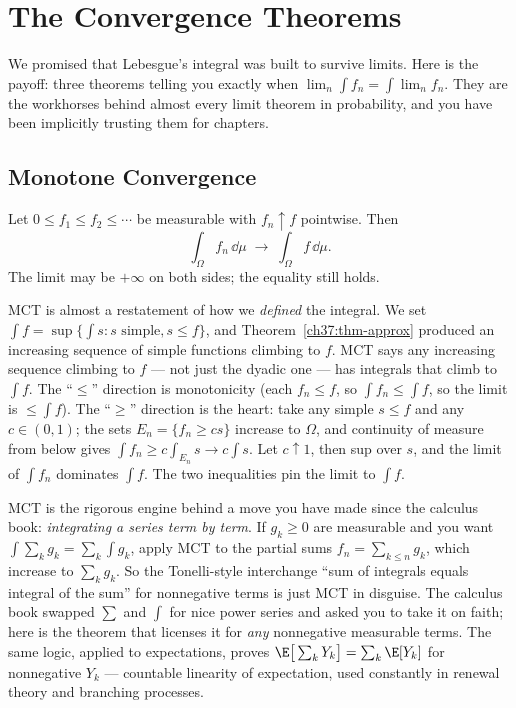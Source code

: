 \section{The Convergence Theorems}
\label{ch37:convergence}

We promised that Lebesgue's integral was built to survive limits. Here is the
payoff: three theorems telling you exactly when
$\lim_n \int f_n = \int \lim_n f_n$. They are the workhorses behind almost every
limit theorem in probability, and you have been implicitly trusting them for
chapters.

\subsection{Monotone Convergence}

\begin{theorem}
\label{ch37:thm-mct}
Let $0\le f_1\le f_2\le\cdots$ be measurable with $f_n\uparrow f$ pointwise.
Then
\[
  \int_\Omega f_n\,\dd\mu \;\longrightarrow\; \int_\Omega f\,\dd\mu .
\]
The limit may be $+\infty$ on both sides; the equality still holds.
\end{theorem}

\begin{whybox}
MCT is almost a restatement of how we \emph{defined} the integral. We set
$\int f = \sup\{\int s : s \text{ simple}, s\le f\}$, and
Theorem~\ref{ch37:thm-approx} produced an increasing sequence of simple
functions climbing to $f$. MCT says any increasing sequence climbing to $f$ ---
not just the dyadic one --- has integrals that climb to $\int f$. The
``$\le$'' direction is monotonicity (each $f_n\le f$, so $\int f_n\le\int f$,
so the limit is $\le\int f$). The ``$\ge$'' direction is the heart: take any
simple $s\le f$ and any $c\in(0,1)$; the sets $E_n=\{f_n\ge cs\}$ increase to
$\Omega$, and continuity of measure from below gives $\int f_n \ge c\int_{E_n} s
\to c\int s$. Let $c\uparrow 1$, then sup over $s$, and the limit of $\int f_n$
dominates $\int f$. The two inequalities pin the limit to $\int f$.
\end{whybox}

\begin{connectionbox}
MCT is the rigorous engine behind a move you have made since the calculus book:
\emph{integrating a series term by term}. If $g_k\ge 0$ are measurable and you
want $\int \sum_k g_k = \sum_k \int g_k$, apply MCT to the partial sums
$f_n=\sum_{k\le n} g_k$, which increase to $\sum_k g_k$. So the Tonelli-style
interchange ``sum of integrals equals integral of the sum'' for nonnegative
terms is just MCT in disguise. The calculus book swapped $\sum$ and $\int$ for
nice power series and asked you to take it on faith; here is the theorem that
licenses it for \emph{any} nonnegative measurable terms. The same logic, applied
to expectations, proves $\E\big[\sum_k Y_k\big]=\sum_k \E[Y_k]$ for nonnegative
$Y_k$ --- countable linearity of expectation, used constantly in renewal theory
and branching processes.
\end{connectionbox}

